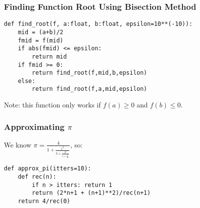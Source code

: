 \documentclass[]{article}
\begin{document}
\begin{multicols}{2}
		\subsubsection{Finding Function Root Using Bisection Method}
		\begin{lstlisting}
def find_root(f, a:float, b:float, epsilon=10**(-10)):
	mid = (a+b)/2
	fmid = f(mid)
	if abs(fmid) <= epsilon:
		return mid
	if fmid >= 0:
		return find_root(f,mid,b,epsilon)
	else:
		return find_root(f,a,mid,epsilon)
\end{lstlisting}
		Note: this function only works if $f(a)\ge 0$ and $f(b)\le 0$.
		\subsubsection{Approximating $\pi$}
		We know $\pi = \frac{4}{1+\frac{1^2}{3+\frac{2^2}{5+\frac{3^2}{\dots}}}}$, so:
		\begin{lstlisting}
def approx_pi(itters=10):
	def rec(n):
		if n > itters: return 1
		return (2*n+1 + (n+1)**2)/rec(n+1)
	return 4/rec(0)
\end{lstlisting}
	\end{multicols}
	
	
\end{document}
